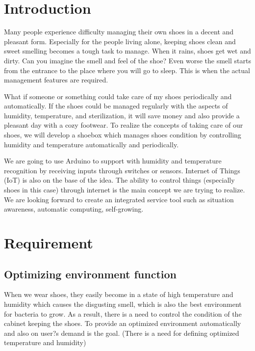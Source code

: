 \documentclass[conference]{IEEEtran}
\begin{document}
\section{Introduction}
Many people experience difficulty managing their own shoes in a decent and pleasant form. Especially for the people living alone, keeping shoes clean and sweet smelling becomes a tough task to manage. When it rains, shoes get wet and dirty. Can you imagine the smell and feel of the shoe? Even worse the smell starts from the entrance to the place where you will go to sleep. This is when the actual management features are required.

What if someone or something could take care of my shoes periodically and automatically. If the shoes could be managed regularly with the aspects of humidity, temperature, and sterilization, it will save money and also provide a pleasant day with a cozy footwear. To realize the concepts of taking care of our shoes, we will develop a shoebox which manages shoes condition by controlling humidity and temperature automatically and periodically. 

We are going to use Arduino to support with humidity and temperature recognition by receiving inputs through switches or sensors. Internet of Things (IoT) is also on the base of the idea. The ability to control things (especially shoes in this case) through internet is the main concept we are trying to realize. We are looking forward to create an integrated service tool such as situation awareness, automatic computing, self-growing. \\


\section{Requirement}

\subsection{Optimizing environment function}
When we wear shoes, they easily become in a state of high temperature and humidity which causes the disgusting smell, which is also the best environment for bacteria to grow. As a result, there is a need to control the condition of the cabinet keeping the shoes. To provide an optimized environment automatically and also on user?s demand is the goal. (There is a need for defining optimized temperature and humidity)
\end{document}
